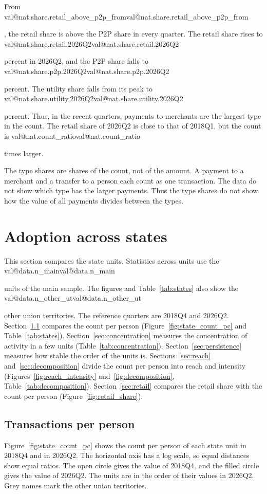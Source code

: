 \documentclass[11pt,a4paper]{article}
\makeatletter
\newcommand{\val}[1]{\ifcsname val@#1\endcsname\csname val@#1\endcsname\else
  \PackageError{study}{Unknown value key `#1'}{Run Rscript src/R/part1_study.R}\fi}
\makeatother
\begin{document}
From \val{nat.share.retail_above_p2p_from}, the retail share is above the P2P share in every quarter. The retail share rises to \val{nat.share.retail.2026Q2} percent in 2026Q2, and the P2P share falls to \val{nat.share.p2p.2026Q2} percent. The utility share falls from its peak to \val{nat.share.utility.2026Q2} percent. Thus, in the recent quarters, payments to merchants are the largest type in the count. The retail share of 2026Q2 is close to that of 2018Q1, but the count is \val{nat.count_ratio} times larger.

The type shares are shares of the count, not of the amount. A payment to a merchant and a transfer to a person each count as one transaction. The data do not show which type has the larger payments. Thus the type shares do not show how the value of all payments divides between the types.

\section{Adoption across states}\label{sec:states}
This section compares the state units. Statistics across units use the \val{data.n_main} units of the main sample. The figures and Table~\ref{tab:states} also show the \val{data.n_other_ut} other union territories. The reference quarters are 2018Q4 and 2026Q2. Section~\ref{sec:count_pc} compares the count per person (Figure~\ref{fig:state_count_pc} and Table~\ref{tab:states}). Section~\ref{sec:concentration} measures the concentration of activity in a few units (Table~\ref{tab:concentration}). Section~\ref{sec:persistence} measures how stable the order of the units is. Sections~\ref{sec:reach} and~\ref{sec:decomposition} divide the count per person into reach and intensity (Figures~\ref{fig:reach_intensity} and~\ref{fig:decomposition}, Table~\ref{tab:decomposition}). Section~\ref{sec:retail} compares the retail share with the count per person (Figure~\ref{fig:retail_share}).

\subsection{Transactions per person}\label{sec:count_pc}
Figure~\ref{fig:state_count_pc} shows the count per person of each state unit in 2018Q4 and in 2026Q2. The horizontal axis has a log scale, so equal distances show equal ratios. The open circle gives the value of 2018Q4, and the filled circle gives the value of 2026Q2. The units are in the order of their values in 2026Q2. Grey names mark the other union territories.
\end{document}
